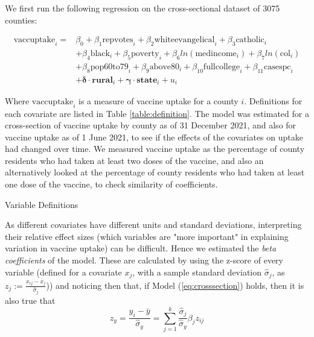 \documentclass[12pt]{article}
\begin{document}
\begin{spacing}{1.5}
		We first run the following regression on the cross-sectional dataset of 3075 counties:
		
		\begin{equation} \label{eq:crosssection}
			\begin{split}
				\textrm{vaccuptake}_i = &\beta_0 + \beta_1 \textrm{repvotes}_i + \beta_2 \textrm{whiteevangelical}_i + \beta_3 \textrm{catholic}_i \\ 
				&+ \beta_4 \textrm{black}_i + \beta_5 \textrm{poverty}_i + \beta_6 ln(\textrm{medincome}_i) + \beta_7 ln(\textrm{col}_i) \\ 
				&+ \beta_8 \textrm{pop60to79}_i + \beta_9 \textrm{above80}_i + \beta_{10} \textrm{fullcollege}_i + \beta_{11} \textrm{casespc}_i \\
				&+\boldsymbol{\delta}\cdot \mathbf{rural}_i + \boldsymbol{\gamma}\cdot \mathbf{state}_i + u_i
			\end{split}
		\end{equation}
		
		Where $\textrm{vaccuptake}_i$ is a measure of vaccine uptake for a county $i$. Definitions for each covariate are listed in Table \ref{table:definition}. The model was estimated for a cross-section of vaccine uptake by county as of 31 December 2021, and also for vaccine uptake as of 1 June 2021, to see if the effects of the covariates on uptake had changed over time. We measured vaccine uptake as the percentage of county residents who had taken at least two doses of the vaccine, and also an alternatively looked at the percentage of county residents who had taken at least one dose of the vaccine, to check similarity of coefficients.
		
		\begin{table}
			\caption{Variable Definitions}
			
			\label{table:definition}
		\end{table}
	
		As different covariates have different units and standard deviations, interpreting their relative effect sizes (which variables are "more important" in explaining variation in vaccine uptake) can be difficult. Hence we estimated the \textit{beta coefficients} of the model. These are calculated by using the z-score of every variable (defined for a covariate $x_j$, with a sample standard deviation $\hat{\sigma}_j$, as $z_j := \frac{x_{ij}-\bar{x}_j}{\hat{\sigma}_j}$)) and noticing then that, if Model (\ref{eq:crosssection}) holds, then it is also true that
		\begin{equation} \label{eq:standardized}
			z_y=\frac{y_i-\bar{y}}{\hat{\sigma}_y} = \sum_{j=1}^{k} \frac{\hat{\sigma}_j}{\hat{\sigma}_y}\beta_j z_{ij}
		\end{equation}
		

\end{spacing}
\end{document}
